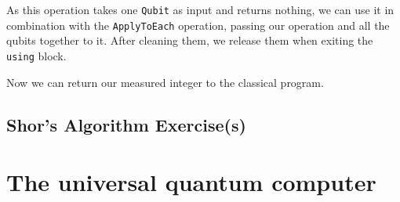 

As this operation takes one \texttt{Qubit} as input and returns nothing, we can use it in combination with the \texttt{ApplyToEach} operation, passing our operation and all the qubits together to it. After cleaning them, we release them when exiting the \texttt{using} block.



Now we can return our measured integer to the classical program.








\subsection{Shor's Algorithm Exercise(s)}

\section{The universal quantum computer}

